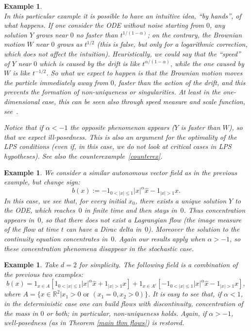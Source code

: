 \documentclass[a4paper,10pt]{article}
\newtheorem{example}[theorem]{Example}
\newcommand{\mr}{\mathbb{R}}
\begin{document}
\begin{example}
\begin{minipage}{\linewidth}
\end{minipage}
\\[0.2cm]

In this particular example it is possible to have an intuitive idea, ``by hands'', of what happens. If one consider the ODE without noise starting from $0$, any solution $Y$ grows near $0$ no faster than $t^{1/(1-\alpha)}$; on the contrary, the Brownian motion $W$ near $0$ grows as $t^{1/2}$ (this is false, but only for a logarithmic correction, which does not affect the intuition). Heuristically, we could say that the ``speed'' of $Y$ near $0$ which is caused by the drift is like  $t^{\alpha/(1-\alpha)}$, while the one caused by $W$ is like $t^{-1/2}$. So what we expect to happen is that the Brownian motion moves the particle immediately away from $0$, faster than the action of the drift, and this prevents the formation of non-uniqueness or singularities. At least in the one-dimensional case, this can be seen also through speed measure and scale function, see~\cite{BREIMAN}.

Notice that if $\alpha<-1$ the opposite phenomenon appears ($Y$ is faster than $W$), so that we expect ill-posedness. This is also an argument for the optimality of the LPS conditions (even if, in this case, we do not look at critical cases in LPS hypotheses). See also the counterexample~\ref{counterex}.
\end{example}

\begin{example}
We consider a similar autonomous vector field as in the previous example, but change sign:
\begin{equation*}
b(x):=-1_{0<|x|\le1}|x|^{\alpha}\hat{x}-1_{|x|>1}x.
\end{equation*}
In this case, we see that, for every initial $x_0$, there exists a unique solution $Y$ to the ODE, which reaches~$0$ in finite time and then stays in~$0$. Thus concentration appears in~$0$, so that there does not exist a Lagrangian flow (the image measure of the flow at time $t$ can have a Dirac delta in~$0$). Moreover the solution to the continuity equation concentrates in~$0$. Again our results apply when $\alpha>-1$, so these concentration phenomena disappear in the stochastic case.
\end{example}

\begin{example}
Take $d=2$ for simplicity. The following field is a combination of the previous two examples:
\begin{equation*}
b(x)=1_{x\in A}[1_{0<|x|\le1}|x|^{\alpha}\hat{x}+1_{|x|>1}x]+1_{x\in A^c}[-1_{0<|x|\le1}|x|^{\alpha}\hat{x}-1_{|x|>1}x],
\end{equation*}
where $A=\{x\in\mr^2|x_1>0\mbox{ or }(x_1=0,x_2>0)\}$. It is easy to see that, if $\alpha<1$, in the deterministic case one can build flows with discontinuity, concentration of the mass in $0$ or both; in particular, non-uniqueness holds. Again, if $\alpha>-1$, well-posedness (as in Theorem 	\ref{main thm flows}) is restored.
\end{example}
\end{document}
